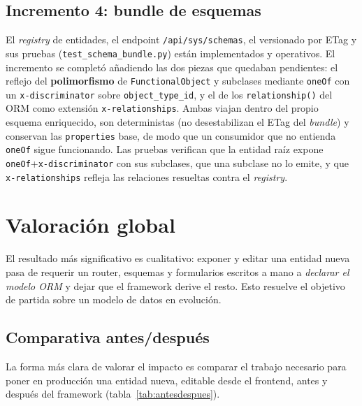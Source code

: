\subsection{Incremento 4: bundle de esquemas}
El \emph{registry} de entidades, el endpoint \texttt{/api/sys/schemas}, el
versionado por ETag y sus pruebas (\texttt{test\_schema\_bundle.py}) están
implementados y operativos. El incremento se completó añadiendo las dos piezas
que quedaban pendientes: el reflejo del \textbf{polimorfismo} de
\texttt{FunctionalObject} y subclases mediante \texttt{oneOf} con un
\texttt{x-discriminator} sobre \texttt{object\_type\_id}, y el de los
\texttt{relationship()} del ORM como extensión \texttt{x-relationships}. Ambas
viajan dentro del propio esquema enriquecido, son deterministas (no
desestabilizan el ETag del \emph{bundle}) y conservan las \texttt{properties}
base, de modo que un consumidor que no entienda \texttt{oneOf} sigue
funcionando. Las pruebas verifican que la entidad raíz expone
\texttt{oneOf}+\texttt{x-discriminator} con sus subclases, que una subclase no
lo emite, y que \texttt{x-relationships} refleja las relaciones resueltas
contra el \emph{registry}.

\section{Valoración global}
El resultado más significativo es cualitativo: exponer y editar una entidad nueva
pasa de requerir un router, esquemas y formularios escritos a mano a
\emph{declarar el modelo ORM} y dejar que el framework derive el resto. Esto
resuelve el objetivo de partida sobre un modelo de datos en evolución.

\subsection{Comparativa antes/después}
La forma más clara de valorar el impacto es comparar el trabajo necesario para
poner en producción una entidad nueva, editable desde el frontend, antes y
después del framework (tabla~\ref{tab:antesdespues}).

